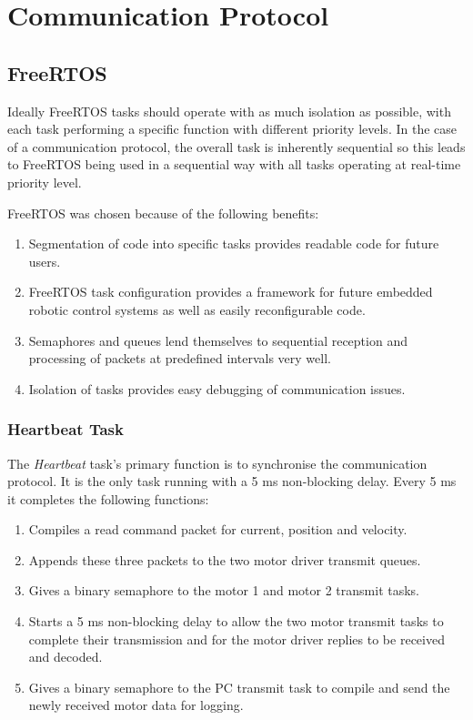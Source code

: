 \chapter{Communication Protocol}

\section{FreeRTOS}

Ideally FreeRTOS tasks should operate with as much isolation as possible, with each task performing a specific function with different priority levels. In the case of a communication protocol, the overall task is inherently sequential so this leads to FreeRTOS being used in a sequential way with all tasks operating at real-time priority level. 

FreeRTOS was chosen because of the following benefits:

\begin{enumerate}
\item Segmentation of code into specific tasks provides readable code for future users.
\item FreeRTOS task configuration provides a framework for future embedded robotic control systems as well as easily reconfigurable code.
\item Semaphores and queues lend themselves to sequential reception and processing of packets at predefined intervals very well.
\item Isolation of tasks provides easy debugging of communication issues.
\end{enumerate}

\subsection{Heartbeat Task}
The \textit{Heartbeat} task's primary function is to synchronise the communication protocol. It is the only task running with a 5 ms non-blocking delay. Every 5 ms it completes the following functions:

\begin{enumerate}
\item Compiles a read command packet for current, position and velocity.
\item Appends these three packets to the two motor driver transmit queues. 
\item Gives a binary semaphore to the motor 1 and motor 2 transmit tasks.
\item Starts a 5 ms non-blocking delay to allow the two motor transmit tasks to complete their transmission and for the motor driver replies to be received and decoded.
\item Gives a binary semaphore to the PC transmit task to compile and send the newly received motor data for logging.
\end{enumerate}

